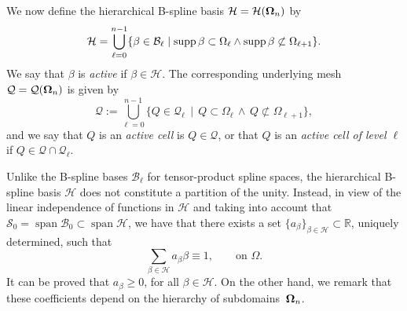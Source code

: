 \documentclass[a4paper]{siamltex1213}
\DeclareMathOperator{\Span}{span}
\newcommand\BB{\mathcal B}
\newcommand\QQ{\mathcal Q}
\newcommand\HH{\mathcal H}
\newcommand\VV{\mathcal S}
\newcommand\RRR{\mathcal R}
\newcommand{\RR}{\mathbb R}
\begin{document}
We now define the hierarchical B-spline basis ${\HH}= {\HH}({\bf\Omega}_n)$ by 
\begin{equation}\label{E:Hierarchical basis}
{\HH}= \bigcup_{\ell = 0}^{n-1} \{\beta \in \BB_\ell \mid \supp \beta 
\subset \Omega_\ell \wedge  \supp \beta \not\subset \Omega_{\ell+1}\}.
\end{equation} 
We say that $\beta$ is \emph{active} if $\beta\in\HH$. The 
corresponding underlying mesh $\QQ = \QQ({\bf\Omega}_n)$ is given 
by
\begin{equation}\label{E:hierarchical mesh}
\QQ:= \bigcup_{\ell = 0}^{n-1} \{ Q\in\QQ_\ell\,\mid\, Q\subset \Omega_\ell 
\,\wedge\, Q\not\subset \Omega_{\ell+1}\}, 
\end{equation}
and we say that $Q$ is an \emph{active cell} is $Q\in\QQ$, or that $Q$ is an 
\emph{active cell of level $\ell$} if $Q\in\QQ\cap \QQ_\ell$.


Unlike the B-spline bases $\BB_\ell$ for tensor-product spline spaces, the hierarchical B-spline basis $\HH$ does not constitute a partition of the unity. Instead, in view of the linear independence of functions in $\HH$ and taking into account that $\VV_0=\Span\BB_0\subset\Span\HH$, we have that there exists a set $\{a_\beta\}_{\beta\in\HH}\subset \RR$, uniquely determined, such that
 \begin{equation}\label{E:partition of the unity in the hierarchical space}
\sum_{\beta\in {\HH}} a_\beta \beta \equiv 1, \qquad\text{on } \Omega. 
\end{equation}
 It can be proved that $a_\beta\ge 0$, for all $\beta\in\HH$. On the other hand, we remark that these coefficients depend on the hierarchy of subdomains~${\bf\Omega}_n$.
\end{document}
